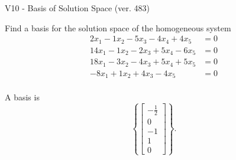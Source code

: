 \begin{exercise}
  \begin{exerciseTitle}V10 - Basis of Solution Space (ver. 483)\end{exerciseTitle}
  \begin{exerciseStatement}
    Find a basis for the solution space of the homogeneous system 
\begin{align*}
 2 x_ 1 -1 x_ 2 -5 x_ 3 -4 x_ 4 + 4 x_ 5 &= 0  \\ 
  14 x_ 1 -1 x_ 2 -2 x_ 3 + 5 x_ 4 -6 x_ 5 &= 0  \\ 
  18 x_ 1 -3 x_ 2 -4 x_ 3 + 5 x_ 4 + 5 x_ 5 &= 0  \\ 
  -8 x_ 1 + 1 x_ 2 + 4 x_ 3 -4 x_ 5 &= 0  \\ 
 \end{align*}


 
  \end{exerciseStatement}

  \begin{exerciseAnswer}
   A basis is   
\[\left\{\left[\begin{array}{c}
-\frac{1}{2} \\
0 \\
-1 \\
1 \\
0
\end{array}\right]\right\}.\]

  


  \end{exerciseAnswer}
\end{exercise}